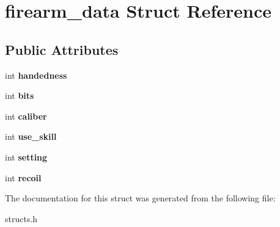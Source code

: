 \hypertarget{structfirearm__data}{\section{firearm\-\_\-data Struct Reference}
\label{structfirearm__data}
}
\subsection*{Public Attributes}
\begin{DoxyCompactItemize}
\item 
\hypertarget{structfirearm__data_afcc3b09e0b9265b8f744bde08a722af7}{int {\bfseries handedness}}\label{structfirearm__data_afcc3b09e0b9265b8f744bde08a722af7}

\item 
\hypertarget{structfirearm__data_a2299ff148fc0cf282f8ba6cdb1e3b2c2}{int {\bfseries bits}}\label{structfirearm__data_a2299ff148fc0cf282f8ba6cdb1e3b2c2}

\item 
\hypertarget{structfirearm__data_a3cee40a699ac83198eeb87558d37b4e5}{int {\bfseries caliber}}\label{structfirearm__data_a3cee40a699ac83198eeb87558d37b4e5}

\item 
\hypertarget{structfirearm__data_a2b7980961b78c7521e1d33be34ca1bbd}{int {\bfseries use\-\_\-skill}}\label{structfirearm__data_a2b7980961b78c7521e1d33be34ca1bbd}

\item 
\hypertarget{structfirearm__data_abcdf5e78cbcf3d2cb530e21aef3338bf}{int {\bfseries setting}}\label{structfirearm__data_abcdf5e78cbcf3d2cb530e21aef3338bf}

\item 
\hypertarget{structfirearm__data_adf714faac6c2473fc6a4b6a21e7a9595}{int {\bfseries recoil}}\label{structfirearm__data_adf714faac6c2473fc6a4b6a21e7a9595}

\end{DoxyCompactItemize}


The documentation for this struct was generated from the following file\-:\begin{DoxyCompactItemize}
\item 
structs.\-h\end{DoxyCompactItemize}
